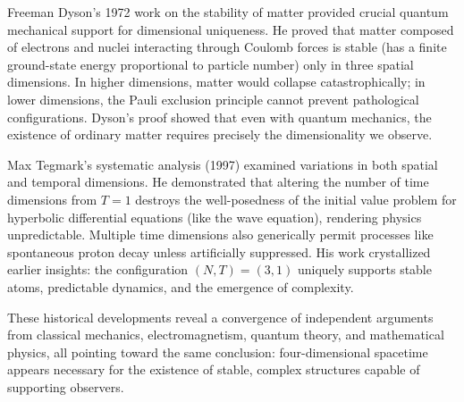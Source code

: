 \begin{historical}
    Freeman Dyson's 1972 work on the stability of matter provided crucial quantum mechanical support for dimensional uniqueness. He proved that matter composed of electrons and nuclei interacting through Coulomb forces is stable (has a finite ground-state energy proportional to particle number) only in three spatial dimensions. In higher dimensions, matter would collapse catastrophically; in lower dimensions, the Pauli exclusion principle cannot prevent pathological configurations. Dyson's proof showed that even with quantum mechanics, the existence of ordinary matter requires precisely the dimensionality we observe.
    
    Max Tegmark's systematic analysis (1997) examined variations in both spatial and temporal dimensions. He demonstrated that altering the number of time dimensions from $T = 1$ destroys the well-posedness of the initial value problem for hyperbolic differential equations (like the wave equation), rendering physics unpredictable. Multiple time dimensions also generically permit processes like spontaneous proton decay unless artificially suppressed. His work crystallized earlier insights: the configuration $(N,T) = (3,1)$ uniquely supports stable atoms, predictable dynamics, and the emergence of complexity.
    
    These historical developments reveal a convergence of independent arguments from classical mechanics, electromagnetism, quantum theory, and mathematical physics, all pointing toward the same conclusion: four-dimensional spacetime appears necessary for the existence of stable, complex structures capable of supporting observers.
    \end{historical}